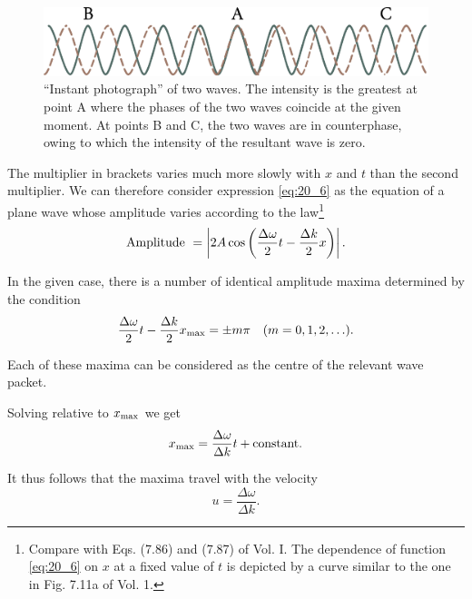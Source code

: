 \begin{figure}[t]
	\begin{center}
		\includegraphics[scale=1]{figures/ch_20/fig_20_4.pdf}
        \caption[]{``Instant photograph'' of two waves. The intensity is the greatest at point A where the phases of the two waves coincide at the given moment. At points B and C, the two waves are in counterphase, owing to which the intensity of the resultant wave is zero.}
		\label{fig:20_4}
	\end{center}
	\vspace{-0.8cm}
\end{figure}

The multiplier in brackets varies much more slowly with $x$ and $t$ than the second multiplier.
We can therefore consider expression \eqref{eq:20_6} as the equation of a plane wave whose amplitude varies according to the law\footnote{Compare with Eqs. (7.86) and (7.87) of Vol. I. The dependence of function \eqref{eq:20_6} on $x$ at a fixed value of $t$ is depicted by a curve similar to the one in Fig. 7.11a of Vol. 1.}
\begin{equation*}
	\text{Amplitude } = \left| 2A\cos\left(\frac{\Delta\omega}{2} t - \frac{\Delta{k}}{2}x\right) \right|.
\end{equation*}

\noindent
In the given case, there is a number of identical amplitude maxima determined by the condition
\begin{equation}\label{eq:20_7}
	\frac{\Delta{\omega}}{2} t - \frac{\Delta{k}}{2} x_{\text{max}} = \pm m \pi \quad (m = 0,1,2,\ldots).
\end{equation}

\noindent
Each of these maxima can be considered as the centre of the relevant wave packet.

Solving  relative to $x_{\text{max}}$ we get
\begin{equation*}
	x_{\text{max}} = \frac{\Delta{\omega}}{\Delta{k}} t + \text{constant}.
\end{equation*}

\noindent
It thus follows that the maxima travel with the velocity
\begin{equation}\label{eq:20_8}
	u = \frac{\Delta{\omega}}{\Delta{k}}.
\end{equation}

